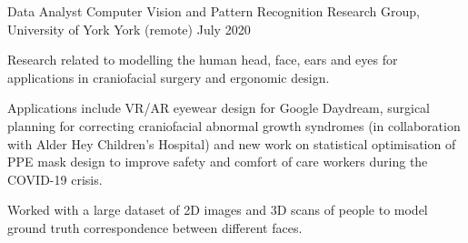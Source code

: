 
\begin{cventries}
  \cventry
    {Data Analyst} %
    {Computer Vision and Pattern Recognition Research Group, University of York} %
    {York (remote)} %
    {July 2020} %
    {
      \begin{cvitems} %
         \item {Research related to modelling the human head, face, ears and eyes for applications in craniofacial surgery and ergonomic design.}
         \vspace{0.5mm}
         \item {Applications include VR/AR eyewear design for Google Daydream, surgical planning for correcting craniofacial abnormal growth syndromes (in collaboration with Alder Hey Children's Hospital) and new work on statistical optimisation of PPE mask design to improve safety and comfort of care workers during the COVID-19 crisis.}
         \vspace{0.5mm}
         \item{Worked with a large dataset of 2D images and 3D scans of people to model ground truth correspondence between different faces.}
      \end{cvitems}
    }
\end{cventries}